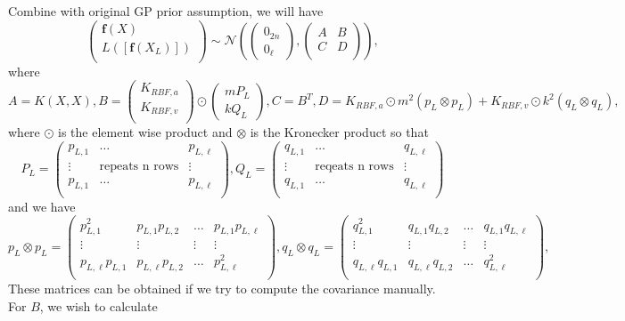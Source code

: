\documentclass{statsmsc}
\begin{document}
Combine with original GP prior assumption, we will have 
$$
\begin{pmatrix}
    \mathbf{f}(X)\\
    L([\mathbf{f}(X_L)])\\
\end{pmatrix}
\sim\mathcal{N}
\left(\begin{pmatrix}
    0_{2n}\\0_{\ell}
\end{pmatrix},\begin{pmatrix}
   A & B \\
   C & D\\ 
\end{pmatrix}\right),
$$
where
$$
A=K(X,X), B=\begin{pmatrix}
    K_{RBF,a} \\ K_{RBF,v} \\
\end{pmatrix}\odot \begin{pmatrix}
    mP_L \\ kQ_L
\end{pmatrix}, C=B^T, D=K_{RBF,a}\odot m^2(p_L\otimes p_L) + K_{RBF,v}\odot k^2(q_L\otimes q_L),
$$
where $\odot$ is the element wise product and $\otimes$ is the Kronecker product so that 
$$
P_L=\begin{pmatrix}
  p_{L,1}  & \dots & p_{L,\ell}  \\
  \vdots & \text{repeats n rows} &  \vdots\\
  p_{L,1}  & \dots & p_{L,\ell}  \\
\end{pmatrix},
Q_L=\begin{pmatrix}
  q_{L,1}  & \dots & q_{L,\ell}  \\
  \vdots & \text{reqeats n rows} &  \vdots\\
  q_{L,1}  & \dots & q_{L,\ell}  \\
\end{pmatrix}
$$
and we have 
$$
p_L\otimes p_L=\begin{pmatrix}
  p_{L,1}^2 & p_{L,1}p_{L,2} & \dots & p_{L,1}p_{L,\ell} \\
  \vdots & \vdots & \vdots & \vdots \\
  p_{L,\ell}p_{L,1} & p_{L,\ell}p_{L,2} & \dots & p_{L,\ell}^2 \\
\end{pmatrix},
q_L\otimes q_L=\begin{pmatrix}
  q_{L,1}^2 & q_{L,1}q_{L,2} & \dots & q_{L,1}q_{L,\ell} \\
  \vdots & \vdots & \vdots & \vdots \\
  q_{L,\ell}q_{L,1} & q_{L,\ell}q_{L,2} & \dots & q_{L,\ell}^2 \\
\end{pmatrix},
$$ 
These matrices can be obtained if we try to compute the covariance manually. 
For $B$, we wish to calculate 
\end{document}
